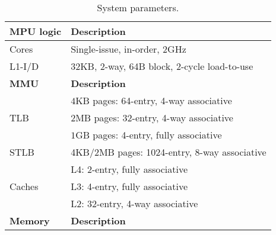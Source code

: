 \begin{table}
	\begin{center}
		\caption{System parameters.}
		\scalebox{0.7}
		\small
		\vspace{0.01in}
		\label{table:system}
		\renewcommand{\arraystretch}{1.0} 
		{\scriptsize
			\begin{tabular}{ l  l }
				\toprule
				{\bf MPU logic}                  & {\bf Description}  \\
				\toprule
				\multirow{1}{*}{Cores}                       &  Single-issue, in-order, 2GHz \\ 
				\cmidrule{2-2}
				\multirow{1}{*}{L1-I/D}                       &  32KB, 2-way, 64B block, 2-cycle load-to-use \\ 
				\toprule
				{\bf MMU}                  & {\bf Description}  \\
				\toprule
				
				
				\multirow{3}{*}{TLB}	& $4$KB pages: 64-entry, 4-way associative \\
				& $2$MB pages: 32-entry, 4-way associative \\
				& $1$GB pages: 4-entry, fully associative \\
				\cmidrule{2-2}
				\multirow{1}{*}{STLB} 			& 4KB/2MB pages: 1024-entry, 8-way associative \\ 
				
				\cmidrule{2-2}
				\multirow{3}{*}{Caches} 	&	L4: 2-entry, fully associative~\cite{bhattacharjee:large-reach} \\ 
				&       L3: 4-entry, fully associative~\cite{bhattacharjee:large-reach} \\
				&       L2: 32-entry, 4-way associative~\cite{bhattacharjee:large-reach} \\
				
				\toprule
				{\bf Memory}                  & {\bf Description}  \\
				\toprule
				

\end{tabular}}
\end{center}
\end{table}
